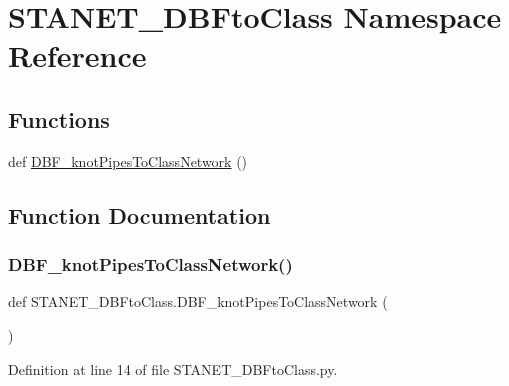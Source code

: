 \hypertarget{namespace_s_t_a_n_e_t___d_b_fto_class}{}\section{S\+T\+A\+N\+E\+T\+\_\+\+D\+B\+Fto\+Class Namespace Reference}
\label{namespace_s_t_a_n_e_t___d_b_fto_class}
\subsection*{Functions}
\begin{DoxyCompactItemize}
\item 
def \hyperlink{namespace_s_t_a_n_e_t___d_b_fto_class_afd5b1efad95a1a687f8c5ffb89d1850e}{D\+B\+F\+\_\+knot\+Pipes\+To\+Class\+Network} ()
\end{DoxyCompactItemize}


\subsection{Function Documentation}
\mbox{\label{namespace_s_t_a_n_e_t___d_b_fto_class_afd5b1efad95a1a687f8c5ffb89d1850e}} 
\subsubsection{\texorpdfstring{D\+B\+F\+\_\+knot\+Pipes\+To\+Class\+Network()}{DBF\_knotPipesToClassNetwork()}}
{\footnotesize\ttfamily def S\+T\+A\+N\+E\+T\+\_\+\+D\+B\+Fto\+Class.\+D\+B\+F\+\_\+knot\+Pipes\+To\+Class\+Network (\begin{DoxyParamCaption}{ }\end{DoxyParamCaption})}



Definition at line 14 of file S\+T\+A\+N\+E\+T\+\_\+\+D\+B\+Fto\+Class.\+py.

